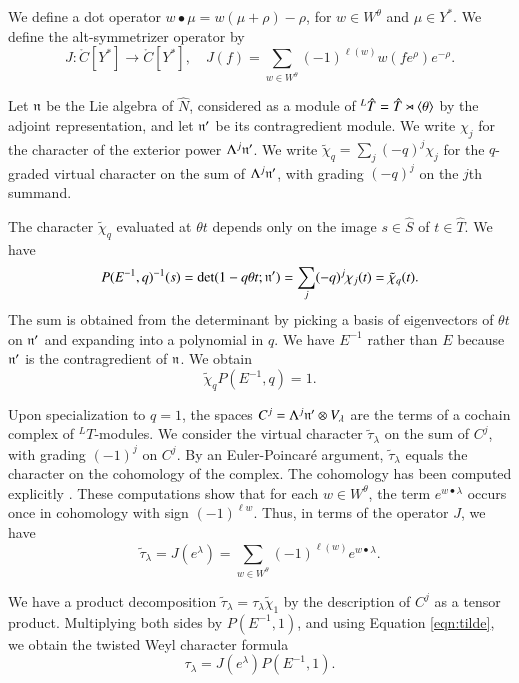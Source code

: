 We define a dot operator $w\bullet \mu = w(\mu+\rho)-\rho$, for $w\in W^\theta$ and $\mu\in Y^*$.
We define the alt-symmetrizer operator by
\[
J:\ring{C}[Y^*]\to \ring{C}[Y^*],\quad J(f) = \sum_{w\in W^\theta} (-1)^{\ell(w)} w(f e^\rho) e^{-\rho}.
\]




Let ${\mathfrak n}$ be the Lie algebra of $\hat N$, considered as a module of ${}^L\hat T=\hat T\rtimes\langle{\theta}\rangle$ by the adjoint representation,
and let ${\mathfrak n}'$ be its contragredient module.  We write $\chi_j$ for the character of the exterior power $\Lambda^j {\mathfrak n}'$.
  We write $\tilde\chi_q = \sum_j (-q)^j\chi_j$
for the $q$-graded virtual character on the sum of $\Lambda^j {\mathfrak n}'$, with grading $(-q)^j$ on the $j$th summand.  

The character $\tilde\chi_q$ evaluated at $\theta t$ depends only on the image $s\in\hat S$ of $t\in \hat T$.
We have 
\[
P(E^{-1},q)^{-1}(s) = \det(1- q\theta t;{\mathfrak n}') = \sum_j (-q)^j \chi_j(t) = \tilde\chi_q(t).
\]
The sum is obtained from
 the determinant  by picking a basis of eigenvectors of $\theta t$ on ${\mathfrak n}'$ and expanding into a polynomial
in $q$.
We have $E^{-1}$ rather than $E$ because ${\mathfrak n}'$ is the contragredient of ${\mathfrak n}$.
We obtain
\begin{equation}\label{eqn:tilde}
\tilde\chi_q P(E^{-1},q) = 1.
\end{equation}

Upon specialization to $q=1$, 
the spaces $C^j=\Lambda^j {\mathfrak n}'\otimes V_\lambda$ are the terms of a cochain complex of ${}^LT$-modules.
We consider the virtual character $\tilde \tau_\lambda$ on  
the sum of $C^j$, with grading $(-1)^j$ on $C^j$.  
By an Euler-Poincar\'e argument, 
$\tilde\tau_\lambda$ equals the character on the cohomology of the complex.  The cohomology has 
been computed explicitly \cite{kostant1961lie}.
These computations show that for each $w\in W^\theta$, the term $e^{w\bullet \lambda}$ 
occurs once in cohomology with sign $(-1)^{\ell w}$.
Thus, in terms of the operator $J$, we have
\[
\tilde \tau_\lambda = J(e^\lambda) = \sum_{w\in W^\theta} (-1)^{\ell(w)} e^{w\bullet\lambda}.
\]

We have  a product decomposition $\tilde \tau_\lambda = \tau_\lambda \tilde \chi_{1}$ by the description of $C^j$ as
a tensor product.
Multiplying both sides by $P(E^{-1},1)$, and using
Equation \ref{eqn:tilde}, we obtain the twisted Weyl character formula
\[
\tau_\lambda = J(e^\lambda) P(E^{-1},1).
\]



